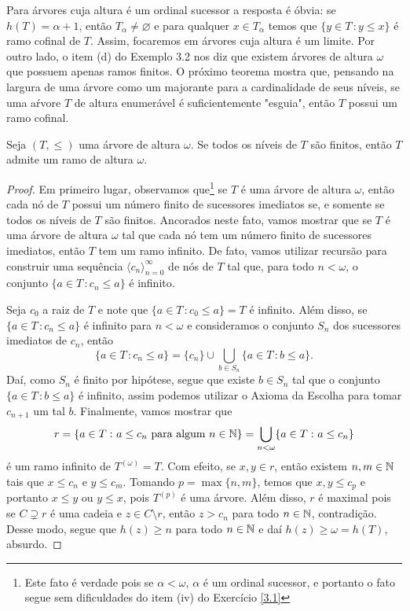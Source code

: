 \documentclass[a4paper]{article}
\begin{document}
  Para árvores cuja altura é um ordinal sucessor a resposta é óbvia: se \(h(T)=\alpha +1\),
  então \(T_\alpha\neq\varnothing\) e para qualquer \(x\in T_\alpha\) temos que
  \(\{y\in T \,\colon y\leq x\}\) é ramo cofinal de \(T\). Assim, focaremos em
  árvores cuja altura é um limite. Por outro lado, o item (d) do Exemplo 3.2 nos diz que
  existem árvores de altura \(\omega\) que possuem apenas ramos finitos. O
  próximo teorema mostra que,  pensando na largura de uma árvore como um
  majorante para a cardinalidade de seus níveis, se uma aŕvore \(T\) de altura
  enumerável é suficientemente "esguia", então \(T\) possui um ramo cofinal.

  \begin{teo}
  Seja \((T,\leq)\) uma árvore de altura \(\omega\). Se todos os níveis de \(T\) são finitos, então
  \(T\) admite um ramo de altura \(\omega\).
  \end{teo}
\begin{proof}
  Em primeiro lugar, observamos que\footnote{Este fato é verdade pois se $\alpha < \omega$, $\alpha$ é um ordinal sucessor, 
  e portanto o fato segue sem dificuldades do item (iv) do Exercício \ref{3.1}} se  \(T\) é uma árvore de altura \(\omega\), então cada nó de \(T\) possui
  um número finito de sucessores imediatos se, e somente se todos os níveis de
  \(T\) são finitos. Ancorados neste fato, vamos mostrar que se \(T\) é uma
  árvore de altura \(\omega\) tal que cada nó tem um número finito de sucessores
  imediatos,  então \(T\) tem um ramo infinito. De fato, vamos utilizar recursão
  para  construir uma sequência \(\langle c_n\rangle_{n=0}^{\infty}\)  de nós de
  \(T\) tal que, para todo \(n<\omega\), o conjunto \(\{a\in T\,\colon c_n\leq a\}\) é
  infinito.

  Seja \(c_0\) a raiz de \(T\) e  note que \(\{a \in T\,\colon c_{0} \leq a \}= T\)
  é infinito. Além disso, se \(\{a\in T\,\colon c_n\leq a\}\) é infinito para
  \(n<\omega\) e consideramos  o
  conjunto \(S_n\) dos sucessores imediatos de \(c_n\), então
  \[
  \{a\in T\,\colon c_n\leq a\} = \{c_n\} \cup\bigcup_{b\in S_n} \{a\in T\,\colon b\leq a\}.
  \]
 Daí, como \(S_n\) é finito por hipótese, segue que existe \(b\in S_n\) tal que
 o conjunto \(\{a\in T\,\colon b\leq a\}\) é infinito, assim podemos utilizar o
 Axioma da Escolha para tomar \(c_{n+1}\) um tal \(b\). 
 Finalmente, vamos mostrar que
  \[r=\{a\in T\,\colon a\leq c_n \text{ para algum }
    n\in\mathbb{N}\}=\bigcup_{n <\omega}\{a\in T\,\colon a\leq c_n\}\]
  é um ramo infinito de \(T^{(\omega)}=T\).
  Com efeito, se \(x,y\in r\), então existem \(n,m\in\mathbb{N}\) tais que
  \(x\leq c_n\) e \(y\leq c_m\).
  Tomando \(p=\max\{n,m\}\), temos que \(x,y\leq c_p\) e portanto  \(x\leq y\) ou
  \(y\leq x\),  pois \(T^{(p)}\) é uma árvore. Além disso, \(r\) é maximal pois se
  \(C\supsetneq r\) é uma  cadeia e \(z\in C\setminus r\), então \(z>c_n\)
  para todo \(n\in\mathbb{N}\), contradição. Desse modo, segue que \(h(z)\geq n\)
  para todo \(n\in\mathbb{N}\) e daí \(h(z)\geq\omega=h(T)\), absurdo.
  \end{proof}
\end{document}
